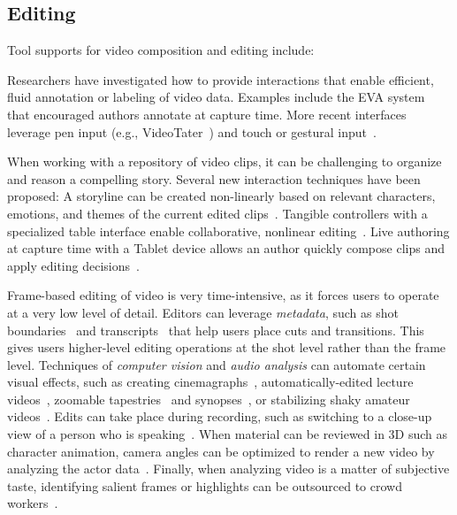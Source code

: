 
\subsection{Editing}
Tool supports for video composition and editing include:

Researchers have investigated how to provide interactions that enable efficient, fluid annotation or labeling of video data. Examples include the EVA system~\cite{Mackay:1989} that encouraged authors annotate at capture time. More recent interfaces leverage pen input (e.g., VideoTater~\cite{Diakopoulos:2006vt}) and touch or gestural input~\cite{Sarkar:2016:SCC:2858036.2858199}.

When working with a repository of video clips, it can be challenging to organize and reason a compelling story. Several new interaction techniques have been proposed:
%
A storyline can be created non-linearly based on relevant characters, emotions, and themes of the current edited clips~\cite{Shen:2009:WNE:1518701.1518825}.
%
Tangible controllers with a specialized table interface enable collaborative, nonlinear editing~\cite{Bartindale:2012:STS:2207676.2207700,Bartindale:2016:TSS:2818048.2819929}.
%
Live authoring at capture time with a Tablet device allows an author quickly compose clips and apply editing decisions~\cite{Freeman:2014:LLA:2611105.2557304}.

Frame-based editing of video is very time-intensive, as it forces users to operate at a very low level of detail. Editors can leverage \emph{metadata}, such as shot boundaries~\cite{Casares:2002dx} and transcripts~\cite{Berthouzoz:2012} that help users place cuts and transitions. This gives users higher-level editing operations at the shot level rather than the frame level.
%
Techniques of \emph{computer vision} and \emph{audio analysis} can automate certain visual effects, such as creating cinemagraphs~\cite{Bai:2012, Joshi:2012}, automatically-edited lecture videos~\cite{Heck:2007}, zoomable tapestries~\cite{Barnes:2010} and synopses~\cite{Pritch:2009vl}, or stabilizing shaky amateur videos~\cite{Liu:2011}.
%
Edits can take place during recording, such as switching to a close-up view of a person who is speaking~\cite{Ranjan:2010}.
%
When material can be reviewed in 3D such as character animation, camera angles can be optimized to render a new video by analyzing the actor data~\cite{assa2005action,assa2008motion}.
%
Finally, when analyzing video is a matter of subjective taste, identifying salient frames or highlights can be outsourced to crowd workers~\cite{Bernstein:2011uj,Tang:2012:ECS:2207676.2208622}.

